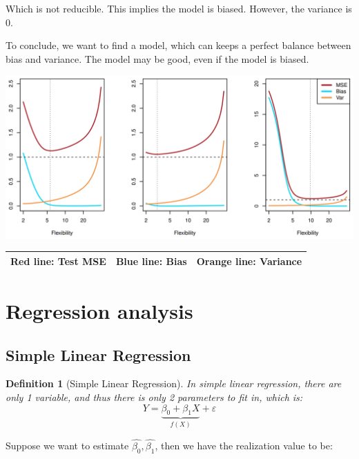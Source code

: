 \documentclass{article}
\theoremstyle{MyNonumberplain}
\theoremstyle{break}
\newcommand{\bt}[1]{\beta_{#1}}
\theoremstyle{break}
\theoremstyle{break}
\theoremstyle{break}
\newtheorem{definition}{Definition}[section]
\begin{document}
Which is not reducible. This implies the model is biased. However, the variance is 0. 

To conclude, we want to find a model, which can keeps a perfect balance between bias and variance. The
model may be good, even if the model is biased.

\begin{center}
    \includegraphics*[scale=0.3]{img6.png}
\end{center}

\begin{table}[!h]
    \centering
    \begin{tabular}{|l|l|l|}
    \hline
           Red line: Test MSE     & Blue line: Bias                                       & Orange line: Variance                                        \\ \hline
    \end{tabular}
\end{table}

\section{Regression analysis}
\subsection{Simple Linear Regression}
\begin{defbox}
    \begin{definition}[Simple Linear Regression]
        In simple linear regression, there are only 1 variable, and thus there is only 2 parameters to fit in, which is:
        $$Y=\underbrace{\bt{0}+\bt{1}X}_{f(X)}+\varepsilon$$
    \end{definition}
\end{defbox}

Suppose we want to estimate $\hat{\bt{0}},\hat{\bt{1}}$, then we have the realization value to be:
\end{document}
